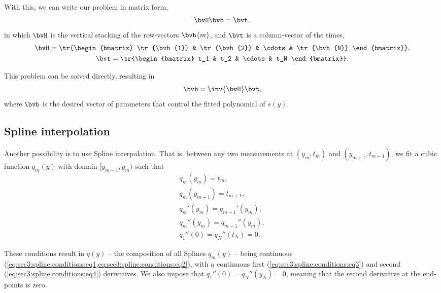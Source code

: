With this, we can write our problem in matrix form,
\begin{equation}
	\bvH \bvb = \bvt,
\end{equation}
in which $\bvH$ is the vertical stacking of the row-vectors $\bvh{m}$, and $\bvt$ is a column-vector of the times,
\begin{subequations}
	\begin{gather}
		\bvH = \tr{\begin{bmatrix}
				\tr{\bvh{1}} & \tr{\bvh{2}} & \cdots & \tr{\bvh{N}}
		\end{bmatrix}}, \\
		\bvt = \tr{\begin{bmatrix}
				t_1 & t_2 & \cdots & t_N
		\end{bmatrix}}.
	\end{gather}
\end{subequations}

This problem can be solved directly, resulting in
\begin{equation}
	\bvb = \inv{\bvH} \bvt,
\end{equation}
where $\bvb$ is the desired vector of parameters that control the fitted polynomial of $s(y)$.

\subsection{Spline interpolation}

Another possibility is to use Spline interpolation. That is, between any two measurements at $(y_m,t_m)$ and $(y_{m+1},t_{m+1})$, we fit a cubic function $q_m(y)$ with domain $[y_{m-1},y_{m})$ such that
\begin{subequations}
	\begin{gather}
		q_m(y_m) = t_m, \label{eq:sec3:spline:conditions:eq1} \\
		q_m(y_{m+1}) = t_{m+1},  \label{eq:sec3:spline:conditions:eq2} \\
		q_m'(y_m) = q_{m-1}'(y_m),  \label{eq:sec3:spline:conditions:eq3} \\
		q_m''(y_m) = q_{m-1}''(y_m),  \label{eq:sec3:spline:conditions:eq4} \\
		q_1''(0) = q_N''(t_N) = 0. \label{eq:sec3:spline:conditions:eq5}
	\end{gather}
\end{subequations}

These conditions result in $q(y)$ --  the composition of all Splines $q_m(y)$ -- being continuous (\cref{eq:sec3:spline:conditions:eq1,eq:sec3:spline:conditions:eq2}), with a continuous first (\cref{eq:sec3:spline:conditions:eq3}) and second (\cref{eq:sec3:spline:conditions:eq4}) derivatives. We also impose that $q_1''(0) = q_N''(y_N) = 0$, meaning that the second derivative at the end-points is zero.

